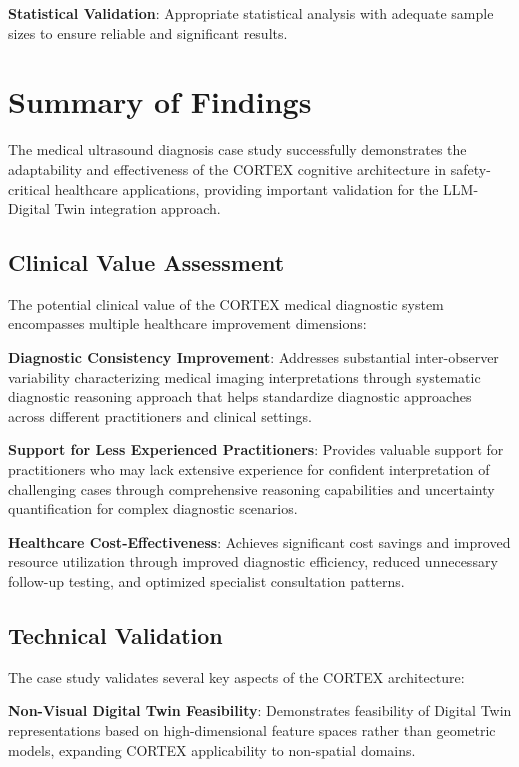 \textbf{Statistical Validation}: Appropriate statistical analysis with adequate sample sizes to ensure reliable and significant results.

\section{Summary of Findings}

The medical ultrasound diagnosis case study successfully demonstrates the adaptability and effectiveness of the CORTEX cognitive architecture in safety-critical healthcare applications, providing important validation for the LLM-Digital Twin integration approach.

\subsection{Clinical Value Assessment}

The potential clinical value of the CORTEX medical diagnostic system encompasses multiple healthcare improvement dimensions:

\textbf{Diagnostic Consistency Improvement}: Addresses substantial inter-observer variability characterizing medical imaging interpretations through systematic diagnostic reasoning approach that helps standardize diagnostic approaches across different practitioners and clinical settings.

\textbf{Support for Less Experienced Practitioners}: Provides valuable support for practitioners who may lack extensive experience for confident interpretation of challenging cases through comprehensive reasoning capabilities and uncertainty quantification for complex diagnostic scenarios.

\textbf{Healthcare Cost-Effectiveness}: Achieves significant cost savings and improved resource utilization through improved diagnostic efficiency, reduced unnecessary follow-up testing, and optimized specialist consultation patterns.

\subsection{Technical Validation}

The case study validates several key aspects of the CORTEX architecture:

\textbf{Non-Visual Digital Twin Feasibility}: Demonstrates feasibility of Digital Twin representations based on high-dimensional feature spaces rather than geometric models, expanding CORTEX applicability to non-spatial domains.

